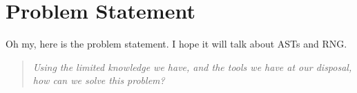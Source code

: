 \documentclass[../../main.tex]{subfiles}
\begin{document}
\section{Problem Statement}

Oh my, here is the problem statement.
I hope it will talk about \acp{AST} and \ac{RNG}. \cite{example} %

\begin{quote}
    \textit{Using the limited knowledge we have, and the tools we have at our disposal, how can we solve this problem?}
\end{quote}
\end{document}
